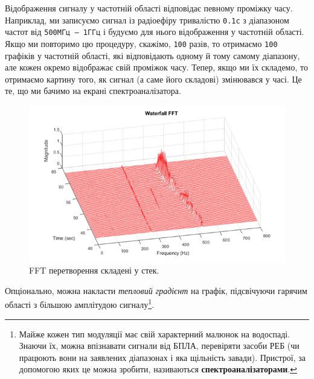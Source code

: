 \documentclass{article}
\begin{document}
Відображення сигналу у частотній області відповідає певному проміжку часу. Наприклад, ми записуємо сигнал із радіоефіру тривалістю \texttt{0.1c} з діапазоном частот від \texttt{500MГц -- 1ГГц} і будуємо для нього відображення у частотній області. Якщо ми повторимо цю процедуру, скажімо, \texttt{100} разів, то отримаємо \texttt{100} графіків у частотній області, які відповідають одному й тому самому діапазону, але кожен окремо відображає свій проміжок часу. Тепер, якщо ми їх складемо, то отримаємо картину того, як сигнал (а саме його складові) змінювався у часі. Це те, що ми бачимо на екрані спектроаналізатора.

\begin{figure}[h!]
\centering
\includegraphics[width=0.75\linewidth]{images/fft-stack.png}
\caption{\label{fig:fft-stack}FFT перетворення складені у стек.}
\end{figure}

Опціонально, можна накласти \textit{тепловий градієнт} на графік, підсвічуючи гарячим області з більшою амплітудою сигналу\footnote{Майже кожен тип модуляції має свій характерний малюнок на водоспаді. Знаючи їх, можна впізнавати сигнали від БПЛА, перевіряти засоби РЕБ (чи працюють вони на заявлених діапазонах і яка щільність завади). Пристрої, за допомогою яких це можна зробити, називаються \textbf{спектроаналізаторами}.}.
\end{document}
